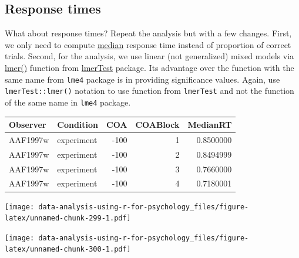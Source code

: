 \documentclass[
]{book}
\begin{document}
\hypertarget{response-times}{%
\subsection*{Response times}\label{response-times}}

What about response times? Repeat the analysis but with a few changes. First, we only need to compute \href{https://stat.ethz.ch/R-manual/R-devel/library/stats/html/median.html}{median} response time instead of proportion of correct trials. Second, for the analysis, we use linear (not generalized) mixed models via \href{https://www.rdocumentation.org/packages/lmerTest/versions/2.0-36/topics/lmer}{lmer()} function from \href{https://github.com/runehaubo/lmerTestR}{lmerTest} package. Its advantage over the function with the same name from \texttt{lme4} package is in providing significance values. Again, use \texttt{lmerTest::lmer()} notation to use function from \texttt{lmerTest} and not the function of the same name in \texttt{lme4} package.

\begin{tabular}{l|l|r|r|r}
\hline
Observer & Condition & COA & COABlock & MedianRT\\
\hline
AAF1997w & experiment & -100 & 1 & 0.8500000\\
\hline
AAF1997w & experiment & -100 & 2 & 0.8494999\\
\hline
AAF1997w & experiment & -100 & 3 & 0.7660000\\
\hline
AAF1997w & experiment & -100 & 4 & 0.7180001\\
\hline
\end{tabular}

\texttt{[image: data-analysis-using-r-for-psychology\_files/figure-latex/unnamed-chunk-299-1.pdf]}

\texttt{[image: data-analysis-using-r-for-psychology\_files/figure-latex/unnamed-chunk-300-1.pdf]}
\end{document}
